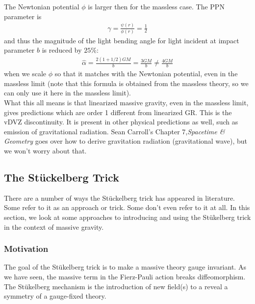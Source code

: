 \documentclass{book}
\theoremstyle{definition}
\newcommand{\f}[2]{\frac{#1}{#2}}
\begin{document}
The Newtonian potential $\phi$ is larger then for the massless case. The PPN parameter is
\begin{align}
\boxed{\gamma = \f{\psi(r)}{\phi(r)} = \f{1}{2}}
\end{align} 
and thus the magnitude of the light bending angle for light incident at impact parameter $b$ is reduced by $25\%$:
\begin{align}
\boxed{\hat{\alpha} = \f{2(1+ 1/2)GM}{b} = \f{3GM}{b} \neq \f{4GM}{b}}
\end{align}
when we scale $\phi$ so that it matches with the Newtonian potential, even in the massless limit (note that this formula is obtained from the massless theory, so we can only use it here in the massless limit). \\

What this all means is that linearized massive gravity, even in the massless limit, gives predictions which are order 1 different from linearized GR. This is the vDVZ discontinuity. It is present in other physical predictions as well, such as emission of gravitational radiation. Sean Carroll's Chapter 7,\textit{Spacetime \& Geometry} goes over how to derive gravitation radiation (gravitational wave), but we won't worry about that.


















\newpage

\subsection{The St\"{u}ckelberg Trick}

There are a number of ways the St\"{u}ckelberg trick has appeared in literature. Some refer to it as an approach or trick. Some don't even refer to it at all. In this section, we look at some approaches to introducing and using the St\"{u}kelberg trick in the context of massive gravity.

\subsubsection{Motivation}

The goal of the St\"{u}kelberg trick is to make a massive theory gauge invariant. As we have seen, the massive term in the Fierz-Pauli action breaks diffeomorphism. The St\"{u}kelberg mechanism is the introduction of new field(s) to a reveal a symmetry of a gauge-fixed theory. \\
\end{document}

